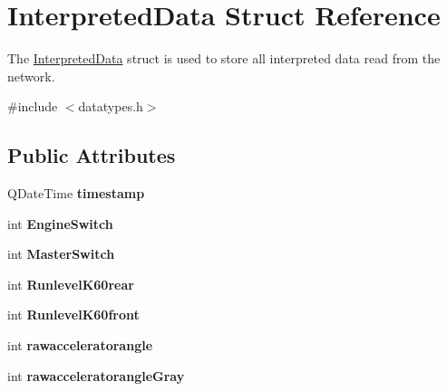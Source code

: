 \hypertarget{struct_interpreted_data}{}\section{Interpreted\+Data Struct Reference}
\label{struct_interpreted_data}


The \hyperlink{struct_interpreted_data}{Interpreted\+Data} struct is used to store all interpreted data read from the network.  




{\ttfamily \#include $<$datatypes.\+h$>$}

\subsection*{Public Attributes}
\begin{DoxyCompactItemize}
\item 
\hypertarget{struct_interpreted_data_a575dbb4100a1253cb3e8e2e6a46dd014}{}Q\+Date\+Time {\bfseries timestamp}\label{struct_interpreted_data_a575dbb4100a1253cb3e8e2e6a46dd014}

\item 
\hypertarget{struct_interpreted_data_add4b7dafd9e5bd80ee8600f5cb0c3ed0}{}int {\bfseries Engine\+Switch}\label{struct_interpreted_data_add4b7dafd9e5bd80ee8600f5cb0c3ed0}

\item 
\hypertarget{struct_interpreted_data_afa08eb9585ccf0f7a9424f3dc0d331d7}{}int {\bfseries Master\+Switch}\label{struct_interpreted_data_afa08eb9585ccf0f7a9424f3dc0d331d7}

\item 
\hypertarget{struct_interpreted_data_a0cd97d708630f1fcbd77a3e8a217f3b7}{}int {\bfseries Runlevel\+K60rear}\label{struct_interpreted_data_a0cd97d708630f1fcbd77a3e8a217f3b7}

\item 
\hypertarget{struct_interpreted_data_a2035206f701e9bb511ce4a4b1278d016}{}int {\bfseries Runlevel\+K60front}\label{struct_interpreted_data_a2035206f701e9bb511ce4a4b1278d016}

\item 
\hypertarget{struct_interpreted_data_a6241995c4d6e997a2ef7b9df66f9a23d}{}int {\bfseries rawacceleratorangle}\label{struct_interpreted_data_a6241995c4d6e997a2ef7b9df66f9a23d}

\item 
\hypertarget{struct_interpreted_data_a2efabfd335c25a31d10be9bfab4ad824}{}int {\bfseries rawacceleratorangle\+Gray}\label{struct_interpreted_data_a2efabfd335c25a31d10be9bfab4ad824}


\end{DoxyCompactItemize}
